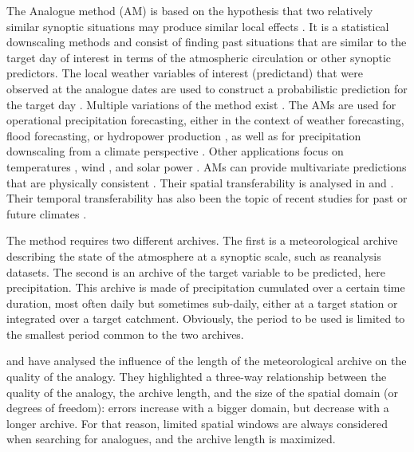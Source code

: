 \documentclass[hess, manuscript]{copernicus}
\begin{document}
	
	
	\introduction  %
	\label{sec:introduction}
	
	The	Analogue method (AM) is based on the hypothesis that two relatively similar synoptic situations may produce similar local effects \citep{Lorenz1956, Lorenz1969}. It is a statistical downscaling methods \citep{Maraun2010} and consist of finding past situations that are similar to the target day of interest in terms of the atmospheric circulation or other synoptic predictors. The local weather variables of interest (predictand) that were observed at the analogue dates are used to construct a probabilistic prediction for the target day \citep{Duband1970, Zorita1999}. Multiple variations of the method exist \citep[a non-exhaustive listing can be found in][]{BenDaoud2016}. The AMs are used for operational precipitation forecasting, either in the context of weather forecasting, flood forecasting, or hydropower production \citep[e.g.,][]{Guilbaud1997, Bontron2005, Hamill2006, Desaint2008a, GarciaHernandez2009b, Bliefernicht2010, Marty2010, Marty2012, Horton2012, Obled2014, Hamill2015, BenDaoud2016}, as well as for precipitation downscaling from a climate perspective \citep[e.g.][]{Radanovics2013, Chardon2014, Dayon2015}. Other applications focus on temperatures \citep{Radinovic1975, Woodcock1980, Kruizinga1983, DelleMonache2013, Caillouet2016}, wind \citep{Gordon1987, DelleMonache2013, DelleMonache2011, Vanvyve2015, Alessandrini2015, Junk2015, Junk2015c}, and solar power \citep{Alessandrini2015a, Bessa2015}. AMs can provide multivariate predictions that are physically consistent \citep{Raynaud2016b}. Their spatial transferability is analysed in \citet{Chardon2014} and \citet{Radanovics2013}. Their temporal transferability has also been the topic of recent studies for past or future climates \citep{Dayon2015, Caillouet2016}.
	
	The method requires two different archives. The first is a meteorological archive describing the state of the atmosphere at a synoptic scale, such as reanalysis datasets. The second is an archive of the target variable to be predicted, here precipitation. This archive is made of precipitation cumulated over a certain time duration, most often daily but sometimes sub-daily, either at a target station or integrated over a target catchment. Obviously, the period to be used is limited to the smallest period common to the two archives.
	
	\citet{Ruosteenoja1988} and \citet{Vandendool1994} have analysed the influence of the length of the meteorological archive on the quality of the analogy. They highlighted a three-way relationship between the quality of the analogy, the archive length, and the size of the spatial domain (or degrees of freedom): errors increase with a bigger domain, but decrease with a longer archive. For that reason, limited spatial windows are always considered when searching for analogues, and the archive length is maximized. 
	
\end{document}
